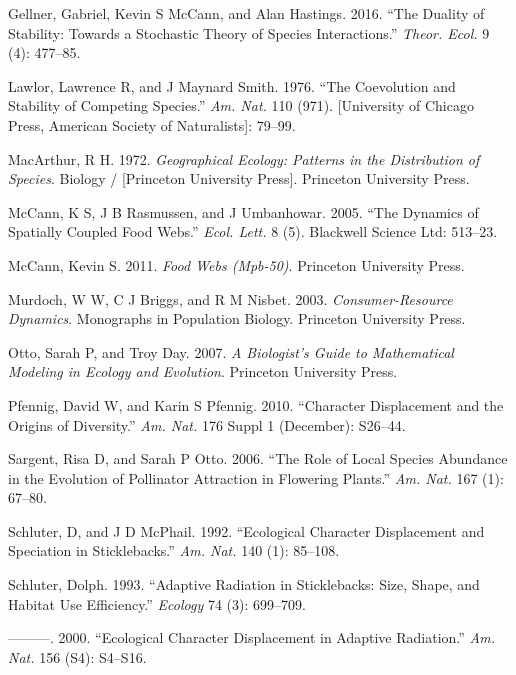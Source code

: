 \documentclass[11pt,]{article}
\begin{document}
\hypertarget{ref-Gellner2016}{}
Gellner, Gabriel, Kevin S McCann, and Alan Hastings. 2016. ``The Duality
of Stability: Towards a Stochastic Theory of Species Interactions.''
\emph{Theor. Ecol.} 9 (4): 477--85.

\hypertarget{ref-Lawlor1976}{}
Lawlor, Lawrence R, and J Maynard Smith. 1976. ``The Coevolution and
Stability of Competing Species.'' \emph{Am. Nat.} 110 (971).
{[}University of Chicago Press, American Society of Naturalists{]}:
79--99.

\hypertarget{ref-MacArthur1972}{}
MacArthur, R H. 1972. \emph{Geographical Ecology: Patterns in the
Distribution of Species}. Biology / {[}Princeton University Press{]}.
Princeton University Press.

\hypertarget{ref-McCann2005}{}
McCann, K S, J B Rasmussen, and J Umbanhowar. 2005. ``The Dynamics of
Spatially Coupled Food Webs.'' \emph{Ecol. Lett.} 8 (5). Blackwell
Science Ltd: 513--23.

\hypertarget{ref-McCann2011}{}
McCann, Kevin S. 2011. \emph{Food Webs (Mpb-50)}. Princeton University
Press.

\hypertarget{ref-Murdoch2003}{}
Murdoch, W W, C J Briggs, and R M Nisbet. 2003. \emph{Consumer-Resource
Dynamics}. Monographs in Population Biology. Princeton University Press.

\hypertarget{ref-Otto2007}{}
Otto, Sarah P, and Troy Day. 2007. \emph{A Biologist's Guide to
Mathematical Modeling in Ecology and Evolution}. Princeton University
Press.

\hypertarget{ref-Pfennig2010}{}
Pfennig, David W, and Karin S Pfennig. 2010. ``Character Displacement
and the Origins of Diversity.'' \emph{Am. Nat.} 176 Suppl 1 (December):
S26--44.

\hypertarget{ref-Sargent2006}{}
Sargent, Risa D, and Sarah P Otto. 2006. ``The Role of Local Species
Abundance in the Evolution of Pollinator Attraction in Flowering
Plants.'' \emph{Am. Nat.} 167 (1): 67--80.

\hypertarget{ref-Schluter1992}{}
Schluter, D, and J D McPhail. 1992. ``Ecological Character Displacement
and Speciation in Sticklebacks.'' \emph{Am. Nat.} 140 (1): 85--108.

\hypertarget{ref-Schluter1993}{}
Schluter, Dolph. 1993. ``Adaptive Radiation in Sticklebacks: Size,
Shape, and Habitat Use Efficiency.'' \emph{Ecology} 74 (3): 699--709.

\hypertarget{ref-Schluter2000}{}
---------. 2000. ``Ecological Character Displacement in Adaptive
Radiation.'' \emph{Am. Nat.} 156 (S4): S4--S16.
\end{document}
